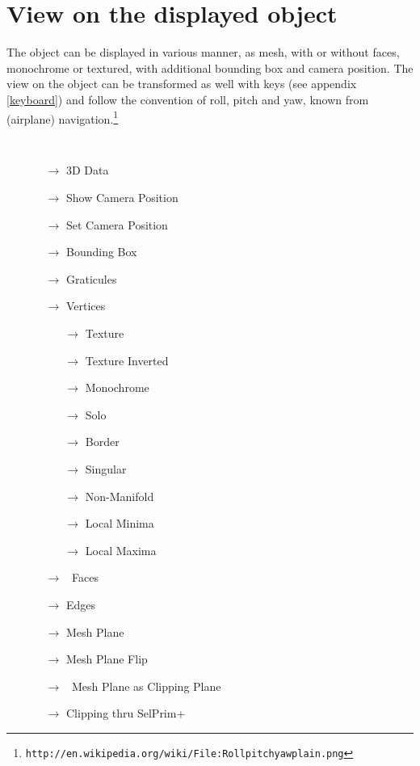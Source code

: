 \section{View on the displayed object}\label{view} 
The object can be displayed in various manner, as mesh, with or without faces, monochrome or textured, with additional bounding box and camera position.
The view on the object can be transformed as well with keys (see appendix \ref{keyboard}) and follow the convention of roll, pitch and yaw, known from (airplane) navigation.\footnote{\tt http://en.wikipedia.org/wiki/File:Rollpitchyawplain.png}
{\tt
\begin{itemize}
\item[] 
  \begin{itemize}
 \item[$\rightarrow$] 3D Data
 \item[$\rightarrow$] Show Camera Position
 \item[$\rightarrow$] Set Camera Position
 \item[$\rightarrow$] Bounding Box\quad {} 
 \item[$\rightarrow$] Graticules\qquad {} 
 \item[$\rightarrow$] Vertices
   \begin{itemize}
   \item[$\rightarrow$] Texture
   \item[$\rightarrow$] Texture Inverted
   \item[$\rightarrow$] Monochrome
   \item[$\rightarrow$] Solo
   \item[$\rightarrow$] Border
   \item[$\rightarrow$] Singular
   \item[$\rightarrow$] Non-Manifold
   \item[$\rightarrow$] Local Minima
   \item[$\rightarrow$] Local Maxima
   \end{itemize}
 \item[$\rightarrow$]  \checkmark\ Faces
 \item[$\rightarrow$] Edges
 \item[$\rightarrow$] Mesh Plane
 \item[$\rightarrow$] Mesh Plane Flip 
 \item[$\rightarrow$] \checkmark\ Mesh Plane as Clipping Plane\quad\, 
 \item[$\rightarrow$] Clipping thru SelPrim\qquad\qquad\qquad {}+

\end{itemize}
\end{itemize}}
